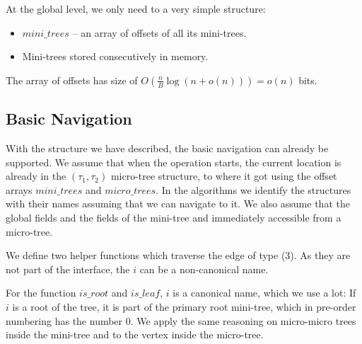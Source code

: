 \bigskip

At the global level, we only need to a very simple structure:
\begin{itemize}
	\item $mini\_trees$ -- an array of offsets of all its mini-trees.
	\item Mini-trees stored consecutively in memory.
\end{itemize}

The array of offsets has size of $O(\frac{n}{B} \log (n + o(n))) = o(n)$ bits.

\subsection{Basic Navigation}

With the structure we have described, the basic navigation can already be supported.
We assume that when the operation starts, the current location is already in the $(\tau_1, \tau_2)$ micro-tree structure, to where it got using the offset arrays $mini\_trees$ and $micro\_trees$.
In the algorithms we identify the structures with their names assuming that we can navigate to it.
We also assume that the global fields and the fields of the mini-tree and immediately accessible from a micro-tree.

We define two helper functions which traverse the edge of type (3).
As they are not part of the interface, the $i$ can be a non-canonical name.

\begin{algorithmic}
			\State {}
		\Else
			\State {}
		\EndIf
	\Else
		\State {}
	\EndIf
\EndFunction
\end{algorithmic}

\begin{algorithmic}
			\State {}
		\Else
			\State {}
		\EndIf
	\Else
		\State {}
	\EndIf
\EndFunction
\end{algorithmic}

For the function $is\_root$ and $is\_leaf$, $i$ is a canonical name, which we use a lot:
If $i$ is a root of the tree, it is part of the primary root mini-tree, which in pre-order numbering has the number $0$.
We apply the same reasoning on micro-micro trees inside the mini-tree and to the vertex inside the micro-tree.

